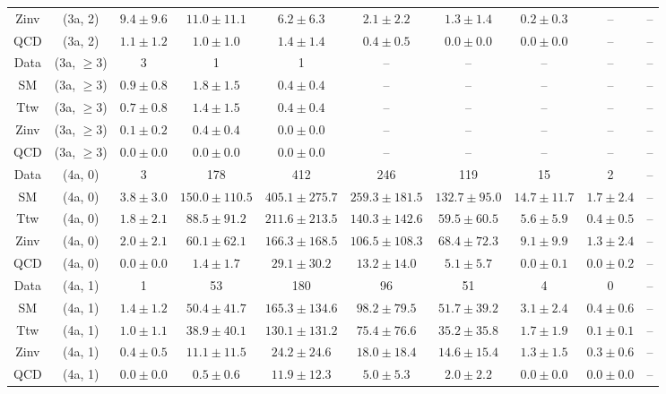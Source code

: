 \begin{table}[h!]
{\begin{tabular}{cccccccccc}
	Zinv & (3a, 2) & $9.4\pm 9.6$ & $11.0\pm 11.1$ & $6.2\pm 6.3$ & $2.1\pm 2.2$ & $1.3\pm 1.4$ & $0.2\pm 0.3$ & -- & -- \\[0.5ex] 
	QCD & (3a, 2) & $1.1\pm 1.2$ & $1.0\pm 1.0$ & $1.4\pm 1.4$ & $0.4\pm 0.5$ & $0.0\pm 0.0$ & $0.0\pm 0.0$ & -- & -- \\[0.5ex] 
	Data & (3a, $\ge3$) & 3 & 1 & 1 & -- & -- & -- & -- & -- \\[0.5ex] 
	SM & (3a, $\ge3$) & $0.9\pm 0.8$ & $1.8\pm 1.5$ & $0.4\pm 0.4$ & -- & -- & -- & -- & -- \\[0.5ex] 
	Ttw & (3a, $\ge3$) & $0.7\pm 0.8$ & $1.4\pm 1.5$ & $0.4\pm 0.4$ & -- & -- & -- & -- & -- \\[0.5ex] 
	Zinv & (3a, $\ge3$) & $0.1\pm 0.2$ & $0.4\pm 0.4$ & $0.0\pm 0.0$ & -- & -- & -- & -- & -- \\[0.5ex] 
	QCD & (3a, $\ge3$) & $0.0\pm 0.0$ & $0.0\pm 0.0$ & $0.0\pm 0.0$ & -- & -- & -- & -- & -- \\[0.5ex] 
	Data & (4a, 0) & 3 & 178 & 412 & 246 & 119 & 15 & 2 & -- \\[0.5ex] 
	SM & (4a, 0) & $3.8\pm 3.0$ & $150.0\pm 110.5$ & $405.1\pm 275.7$ & $259.3\pm 181.5$ & $132.7\pm 95.0$ & $14.7\pm 11.7$ & $1.7\pm 2.4$ & -- \\[0.5ex] 
	Ttw & (4a, 0) & $1.8\pm 2.1$ & $88.5\pm 91.2$ & $211.6\pm 213.5$ & $140.3\pm 142.6$ & $59.5\pm 60.5$ & $5.6\pm 5.9$ & $0.4\pm 0.5$ & -- \\[0.5ex] 
	Zinv & (4a, 0) & $2.0\pm 2.1$ & $60.1\pm 62.1$ & $166.3\pm 168.5$ & $106.5\pm 108.3$ & $68.4\pm 72.3$ & $9.1\pm 9.9$ & $1.3\pm 2.4$ & -- \\[0.5ex] 
	QCD & (4a, 0) & $0.0\pm 0.0$ & $1.4\pm 1.7$ & $29.1\pm 30.2$ & $13.2\pm 14.0$ & $5.1\pm 5.7$ & $0.0\pm 0.1$ & $0.0\pm 0.2$ & -- \\[0.5ex] 
	Data & (4a, 1) & 1 & 53 & 180 & 96 & 51 & 4 & 0 & -- \\[0.5ex] 
	SM & (4a, 1) & $1.4\pm 1.2$ & $50.4\pm 41.7$ & $165.3\pm 134.6$ & $98.2\pm 79.5$ & $51.7\pm 39.2$ & $3.1\pm 2.4$ & $0.4\pm 0.6$ & -- \\[0.5ex] 
	Ttw & (4a, 1) & $1.0\pm 1.1$ & $38.9\pm 40.1$ & $130.1\pm 131.2$ & $75.4\pm 76.6$ & $35.2\pm 35.8$ & $1.7\pm 1.9$ & $0.1\pm 0.1$ & -- \\[0.5ex] 
	Zinv & (4a, 1) & $0.4\pm 0.5$ & $11.1\pm 11.5$ & $24.2\pm 24.6$ & $18.0\pm 18.4$ & $14.6\pm 15.4$ & $1.3\pm 1.5$ & $0.3\pm 0.6$ & -- \\[0.5ex] 
	QCD & (4a, 1) & $0.0\pm 0.0$ & $0.5\pm 0.6$ & $11.9\pm 12.3$ & $5.0\pm 5.3$ & $2.0\pm 2.2$ & $0.0\pm 0.0$ & $0.0\pm 0.0$ & -- \\[0.5ex] 

\end{tabular}}
\end{table}
